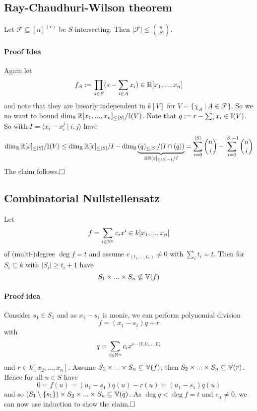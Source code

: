 \subsection{Ray-Chaudhuri-Wilson theorem}
Let $\mathcal{F} \subseteq [n]^{(r)}$ be $S$-intersecting. Then $|\mathcal{F}| \leq {n \choose |S|}$.
\paragraph{Proof Idea} Again let
\begin{equation*}
    f_A := \prod_{s \in S} (s - \sum_{i \in A} x_i) \in \mathbb{R}[x_1, ..., x_n]
\end{equation*}
and note that they are linearly independent in $k[V]$ for $V = \{ \chi_A \ | \ A \in \mathcal{F} \}$.
So we no want to bound $\dim_{\mathbb{R}} \mathbb{R}[x_1, ..., x_n]_{\leq |S|} / \mathbb{I}(V)$.
Note that $q := r - \sum_i x_i \in \mathbb{I}(V)$. So with $I = \langle x_i - x_i^j \ | \ i, j \rangle$ have
\begin{equation*}
    \dim_{\mathbb{R}} \mathbb{R}[x]_{\leq |S|} / \mathbb{I}(V) \leq \dim_{\mathbb{R}} \mathbb{R}[x]_{\leq |S|} / I - \dim_{\mathbb{R}} \underbrace{(q)_{\leq |S|} / (I \cap (q))}_{\cong \mathbb{R}[x]_{\leq |S| - 1} / I} = \sum_{i = 0}^{|S|} {n \choose i} - \sum_{i = 0}^{|S| - 1} {n \choose i}
\end{equation*}
The claim follows.$\hfill\square$

\subsection{Combinatorial Nullstellensatz}
Let
\begin{equation*}
    f = \sum_{i \in \mathbb{N}^n} c_i x^i \in k[x_1, ..., x_n]
\end{equation*}
of (multi-)degree $\deg f = t$ and assume $c_{(t_1, ..., t_n)} \neq 0$ with $\sum_i t_i = t$.
Then for $S_i \subseteq k$ with $|S_i| \geq t_i + 1$ have
\begin{equation*}
    S_1 \times ... \times S_n \not\subseteq \mathbb{V}(f) 
\end{equation*}
\paragraph{Proof idea} Consider $s_1 \in S_1$ and as $x_1 - s_1$ is monic, we can perform polynomial division
\begin{equation*}
    f = (x_1 - s_1)q + r
\end{equation*}
with
\begin{equation*}
    q = \sum_{i \in \mathbb{N}^n} c_i x^{i - (1, 0, ..., 0)}
\end{equation*}
and $r \in k[x_2, ..., x_n]$. Assume $S_1 \times ... \times S_n \subseteq \mathbb{V}(f)$, then $S_2 \times ... \times S_n \subseteq \mathbb{V}(r)$.
Hence for all $u \in S$ have
\begin{equation*}
    0 = f(u) = (u_1 - s_1) q(u) - r(u) = (u_1 - s_1) q(u)
\end{equation*}
and so $(S_1 \setminus \{ s_1 \}) \times S_2 \times ... \times S_n \subseteq \mathbb{V}(q)$.
As $\deg q < \deg f = t$ and $c_\alpha \neq 0$, we can now use induction to show the claim.$\hfill\square$
